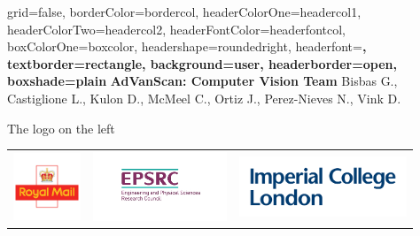 \documentclass[a0paper,portrait]{baposter}
\begin{document}
\begin{poster}{
grid=false,
borderColor=bordercol, %
headerColorOne=headercol1, %
headerColorTwo=headercol2, %
headerFontColor=headerfontcol, %
boxColorOne=boxcolor, %
headershape=roundedright, %
headerfont=\Large\sf\bf, %
textborder=rectangle,
background=user,
headerborder=open, %
boxshade=plain
}
{}
%
%
{\sf\bf AdVanScan: Computer Vision Team} %
{\vspace{1em} Bisbas G., Castiglione L., Kulon D., McMeel C., Ortiz J., Perez-Nieves N., Vink D.
\\ %
} 
 {The logo on the left
	\begin{tabular}{lll}
		\includegraphics[width=2cm]{royalmail} &
		\includegraphics[width=4cm]{epsrc} &
		\includegraphics[width=5cm]{imperial}
	\end{tabular}
}


\end{poster}
\end{document}
